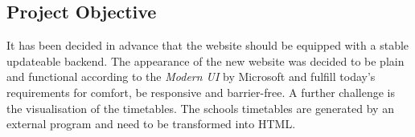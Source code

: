 \subsection{Project Objective}
\label{sec:ProjectObjective}
It has been decided in advance that the website should be equipped with a stable updateable backend. 
The appearance of the new website was decided to be plain and functional according to the \textit{Modern UI} 
by Microsoft \cite{METRO} and fulfill today's requirements for comfort, be responsive and barrier-free. 
A further challenge is the visualisation of the timetables. The schools timetables are 
generated by an external program and need to be transformed into HTML.
